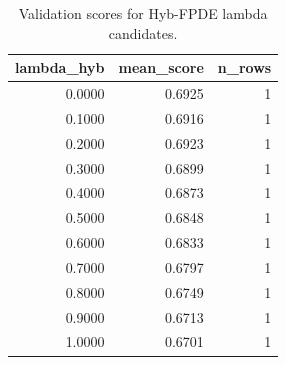 \begin{table}[t]
\caption{Validation scores for Hyb-FPDE lambda candidates.}
\label{tab:lambda_distribution_computed}
\centering
\begin{tabular}{rrr}
\toprule
lambda\_hyb & mean\_score & n\_rows \\
\midrule
0.0000 & 0.6925 & 1 \\
0.1000 & 0.6916 & 1 \\
0.2000 & 0.6923 & 1 \\
0.3000 & 0.6899 & 1 \\
0.4000 & 0.6873 & 1 \\
0.5000 & 0.6848 & 1 \\
0.6000 & 0.6833 & 1 \\
0.7000 & 0.6797 & 1 \\
0.8000 & 0.6749 & 1 \\
0.9000 & 0.6713 & 1 \\
1.0000 & 0.6701 & 1 \\
\bottomrule
\end{tabular}

\end{table}
